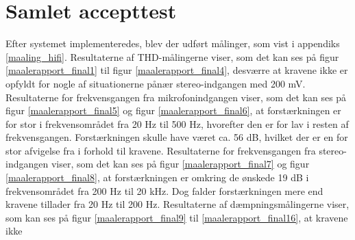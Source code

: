 \chapter{Samlet accepttest}
\label{acceptest}
Efter systemet implementeredes, blev der udført målinger, som vist i appendiks \ref{maaling_hifi}. Resultaterne af THD-målingerne viser, som det kan ses på figur \ref{maalerapport_final1} til figur \ref{maalerapport_final4}, desværre at kravene ikke er opfyldt for nogle af situationerne pånær stereo-indgangen med 200 mV. Resultaterne for frekvensgangen fra mikrofonindgangen viser, som det kan ses på figur \ref{maalerapport_final5} og figur \ref{maalerapport_final6}, at forstærkningen er for stor i frekvensområdet fra 20 Hz til 500 Hz, hvorefter den er for lav i resten af frekvensgangen. Forstærkningen skulle have været ca. 56 dB, hvilket der er en for stor afvigelse fra i forhold til kravene. Resultaterne for frekvensgangen fra stereo-indgangen viser, som det kan ses på figur \ref{maalerapport_final7} og figur \ref{maalerapport_final8}, at forstærkningen er omkring de ønskede 19 dB i frekvensområdet fra 200 Hz til 20 kHz. Dog falder forstærkningen mere end kravene tillader fra 20 Hz til 200 Hz. Resultaterne af dæmpningsmålingerne viser, som kan ses på figur \ref{maalerapport_final9} til \ref{maalerapport_final16}, at kravene ikke 



